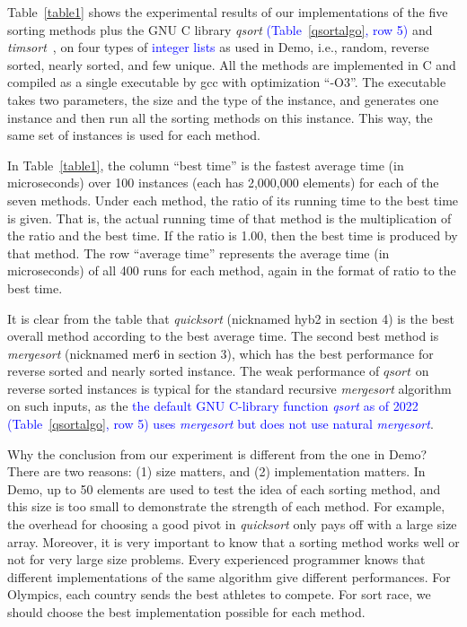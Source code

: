 \documentclass[AMA,STIX1COL]{WileyNJD-v2}
\newcommand{\qusort}{\emph{quicksort }}
\newcommand{\qsort}{\emph{qsort }}
\newcommand{\tsortn}{\emph{timsort}}
\newcommand{\msort}{\emph{mergesort }}
\begin{document}
Table~\ref{table1} shows the experimental results of our implementations of the five sorting methods plus the GNU C library \qsort \textcolor{blue}{(Table~\ref{qsortalgo}, row 5)} and \tsortn~\cite{timsort}, on four types of \textcolor{blue}{integer lists} as used in Demo, i.e., random, reverse sorted, nearly sorted, and few unique. 
All the methods are implemented in C and compiled as a single executable by gcc with optimization “-O3”. 
The executable takes two parameters, the size and the type of the instance, and generates one instance and then run all the sorting methods on this instance. 
This way, the same set of instances is used for each method.

In Table~\ref{table1}, the column “best time” is the fastest average time (in microseconds) over 100 instances (each has 2,000,000 elements) for each of the seven methods.  
Under each method, the ratio of its running time to the best time is given. 
That is, the actual running time of that method is the multiplication of the ratio and the best time. 
If the ratio is 1.00, then the best time is produced by that method. 
The row “average time” represents the average time (in microseconds) of all 400 runs for each method, again in the format of ratio to the best time.

It is clear from the table that \qusort (nicknamed hyb2 in section 4) is the best overall method according to the best average time. 
The second best method is \msort (nicknamed mer6 in section 3), which has the best performance for reverse sorted and nearly sorted instance. 
The weak performance of $qsort$ on reverse sorted instances is typical for the standard recursive \msort algorithm on such inputs, as the \textcolor{blue}{the default GNU C-library function \qsort as of 2022 (Table~\ref{qsortalgo}, row 5) uses \emph{mergesort} but does not use natural \emph{mergesort}}.


Why the conclusion from our experiment is different from the one in Demo? 
There are two reasons: (1) size matters, and (2) implementation matters. 
In Demo, up to 50 elements are used to test the idea of each sorting method, and this size is too small to demonstrate the strength of each method. 
For example, the overhead for choosing a good pivot in \qusort only pays off with a large size array. 
Moreover, it is very important to know that a sorting method works well or not for very large size problems. 
Every experienced programmer knows that different implementations of the same algorithm give different performances. 
For Olympics, each country sends the best athletes to compete. 
For sort race, we should choose the best implementation possible for each method.
\end{document}
